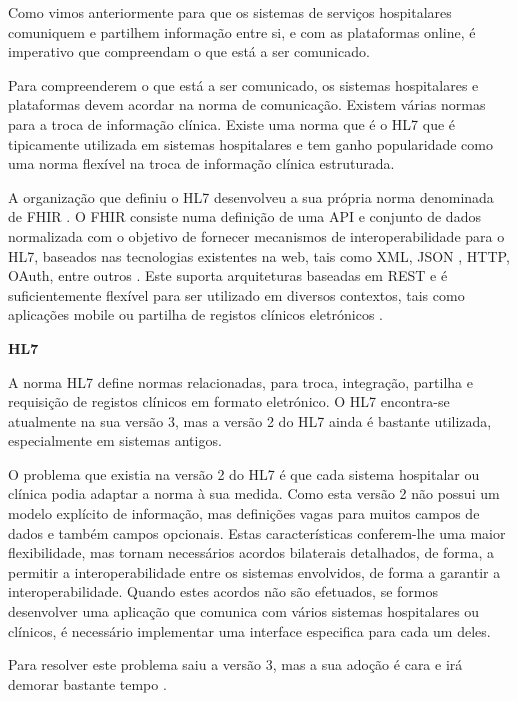 Como vimos anteriormente para que os sistemas de serviços hospitalares comuniquem e partilhem  informação entre si, e com as plataformas online, é imperativo que compreendam o que está a ser comunicado.
\par 
Para compreenderem o que está a ser comunicado, os sistemas hospitalares e plataformas devem acordar na norma de comunicação. Existem várias normas para a troca de informação clínica. Existe uma norma que é o \gls{HL7} que é tipicamente utilizada em sistemas hospitalares \cite{whyihe} e tem ganho popularidade como uma norma flexível na troca de informação clínica estruturada.


A organização que definiu o \gls{HL7} desenvolveu a sua própria norma denominada de \gls{FHIR} \cite{hl7fhir}. O \gls{FHIR} consiste numa definição de uma \gls{API} e conjunto de dados normalizada com o objetivo de fornecer mecanismos de interoperabilidade para o \gls{HL7}, baseados nas tecnologias existentes na web, tais como \gls{XML}, \gls{JSON} , \gls{HTTP}, OAuth, entre outros \cite{hl7fhir}. Este suporta arquiteturas baseadas em \gls{REST} e é suficientemente flexível para ser utilizado em diversos contextos, tais como aplicações mobile ou partilha de registos clínicos eletrónicos \cite{hl7fhir}.

\textbf{HL7}

A norma HL7 define normas relacionadas, para troca, integração, partilha e requisição de  registos clínicos em formato eletrónico\cite{hl7}.
O HL7 encontra-se atualmente na sua versão 3\cite{corepointhealth}, mas a versão 2 do \gls{HL7} ainda é bastante utilizada, especialmente em sistemas antigos. 
\par
O problema que existia na versão 2 do \gls{HL7} é que cada sistema hospitalar ou clínica podia adaptar a norma à sua medida. Como esta versão 2 não possui um modelo explícito de informação, mas definições vagas para muitos campos de dados e também campos opcionais. Estas características conferem-lhe uma maior flexibilidade, mas tornam necessários acordos bilaterais detalhados, de forma, a permitir a interoperabilidade entre os sistemas envolvidos, de forma a garantir a interoperabilidade. Quando estes acordos não são efetuados, se formos desenvolver uma aplicação que comunica com vários  sistemas hospitalares ou clínicos, é necessário implementar uma interface especifica para cada um deles.
\par
Para resolver este problema saiu a versão 3, mas a sua adoção é cara e irá demorar bastante tempo \cite{corepointhealth}.

